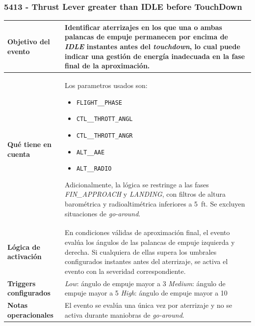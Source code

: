 \documentclass[11pt,a4paper]{article}
\begin{document}
	\subsubsection{5413 - Thrust Lever greater than IDLE before TouchDown}
	\begin{table}[H]
		\centering
		\renewcommand{\arraystretch}{1.3}
		\begin{tabular}{p{5cm} p{9.5cm}}
			\hline
			\textbf{Objetivo del evento} &
			Identificar aterrizajes en los que una o ambas palancas de empuje permanecen por encima de \textit{IDLE} instantes antes del \textit{touchdown}, lo cual puede indicar una gestión de energía inadecuada en la fase final de la aproximación. \\
			\hline
			\textbf{Qué tiene en cuenta} & Los parametros usados son:
			\begin{itemize}
				\item \texttt{FLIGHT\_\_PHASE}
				\item \texttt{CTL\_\_THROTT\_ANGL}
				\item \texttt{CTL\_\_THROTT\_ANGR}
				\item \texttt{ALT\_\_AAE}
				\item \texttt{ALT\_\_RADIO}
			\end{itemize}
			Adicionalmente, la lógica se restringe a las fases \textit{FIN\_APPROACH} y \textit{LANDING}, con filtros de altura barométrica y radioaltimétrica inferiores a \SI{5}{ft}. Se excluyen situaciones de \textit{go-around}. \\
			\hline
			\textbf{Lógica de activación} &
			En condiciones válidas de aproximación final, el evento evalúa los ángulos de las palancas de empuje izquierda y derecha. Si cualquiera de ellas supera los umbrales configurados instantes antes del aterrizaje, se activa el evento con la severidad correspondiente. \\
			\hline
			\textbf{Triggers configurados} &
			\textit{Low}: ángulo de empuje mayor a \SI{3}{} \newline
			\textit{Medium}: ángulo de empuje mayor a \SI{5}{} \newline
			\textit{High}: ángulo de empuje mayor a \SI{10}{} \\
			\hline
			\textbf{Notas operacionales} &
			El evento se evalúa una única vez por aterrizaje y no se activa durante maniobras de \textit{go-around}. \\
			\hline
		\end{tabular}
	\end{table}
	
\end{document}
